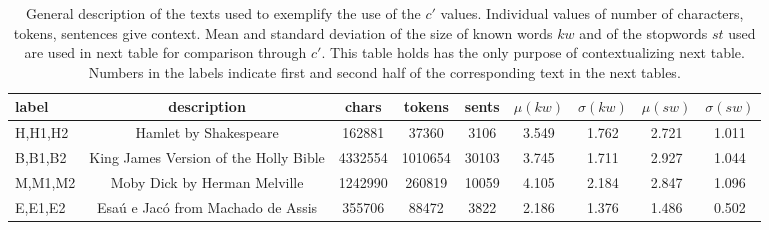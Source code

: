 \begin{table*}[h!]
\begin{center}
\begin{tabular}{| l | c | c | c | c | c | c | c | c |}\hline
label & description & chars & tokens & sents & $\mu(kw)$ & $\sigma(kw)$ & $\mu(sw)$ & $\sigma(sw)$ \\\hline
H,H1,H2 & Hamlet by Shakespeare & 162881 & 37360 & 3106 & 3.549 & 1.762 & 2.721 & 1.011 \\\hline
B,B1,B2 & King James Version of the Holly Bible & 4332554 & 1010654 & 30103 & 3.745 & 1.711 & 2.927 & 1.044 \\\hline
M,M1,M2 & Moby Dick by Herman Melville & 1242990 & 260819 & 10059 & 4.105 & 2.184 & 2.847 & 1.096 \\\hline
E,E1,E2 & Esa\'u e Jac\'o from Machado de Assis & 355706 & 88472 & 3822 & 2.186 & 1.376 & 1.486 & 0.502 \\\hline
\end{tabular}
\caption{General description of the texts used to exemplify the use of the $c'$ values. Individual values of number of characters, tokens, sentences give context. Mean and standard deviation of the size of known words $kw$ and of the stopwords $st$ used are used in next table for comparison through $c'$. This table holds has the only purpose of contextualizing next table. Numbers in the labels indicate first and second half of the corresponding text in the next tables.}
\end{center}
\end{table*}